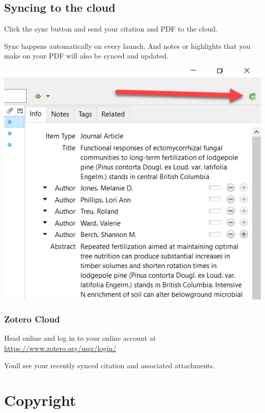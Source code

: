 \documentclass[
]{book}
\begin{document}
\hypertarget{syncing-to-the-cloud}{%
\section{Syncing to the cloud}\label{syncing-to-the-cloud}}

Click the sync button and send your citation and PDF to the cloud.

Sync happens automatically on every launch. And notes or highlights that you make on your PDF will also be synced and updated.

\includegraphics{images/Z_PDFSync.png}

\hypertarget{zotero-cloud}{%
\subsection*{Zotero Cloud}\label{zotero-cloud}}

Head online and log in to your online account at \url{https://www.zotero.org/user/login/}

You\textquotesingle ll see your recently synced citation and associated attachments.

\hypertarget{copyright-1}{%
\chapter{Copyright}\label{copyright-1}}
\end{document}
